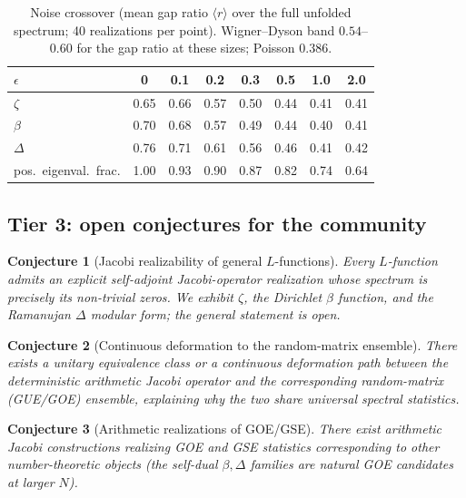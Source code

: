 \documentclass[aps,prx,reprint,floatfix]{revtex4-2}
\newtheorem{conjecture}{Conjecture}
\begin{document}
\begin{table}[htbp]
\centering
\footnotesize
\caption{Noise crossover (mean gap ratio $\langle r\rangle$ over the full
unfolded spectrum; 40 realizations per point). Wigner--Dyson band
$0.54$--$0.60$ for the gap ratio at these sizes; Poisson $0.386$.}
\label{tab:epsc}
\begin{tabular}{lccccccc}
\toprule
$\epsilon$ & 0 & 0.1 & 0.2 & 0.3 & 0.5 & 1.0 & 2.0\\
\midrule
$\zeta$   & 0.65 & 0.66 & 0.57 & 0.50 & 0.44 & 0.41 & 0.41\\
$\beta$   & 0.70 & 0.68 & 0.57 & 0.49 & 0.44 & 0.40 & 0.41\\
$\Delta$  & 0.76 & 0.71 & 0.61 & 0.56 & 0.46 & 0.41 & 0.42\\
pos.\ eigenval.\ frac. & 1.00 & 0.93 & 0.90 & 0.87 & 0.82 & 0.74 & 0.64\\
\bottomrule
\end{tabular}
\end{table}

\subsection{Tier 3: open conjectures for the community}

\begin{conjecture}[Jacobi realizability of general $L$-functions]
Every $L$-function admits an explicit self-adjoint Jacobi-operator
realization whose spectrum is precisely its non-trivial zeros. We exhibit
$\zeta$, the Dirichlet $\beta$ function, and the Ramanujan $\Delta$ modular
form; the general statement is open.
\end{conjecture}

\begin{conjecture}[Continuous deformation to the random-matrix ensemble]
There exists a unitary equivalence class or a continuous deformation path
between the deterministic arithmetic Jacobi operator and the corresponding
random-matrix (GUE/GOE) ensemble, explaining why the two share universal
spectral statistics.
\end{conjecture}

\begin{conjecture}[Arithmetic realizations of GOE/GSE]
There exist arithmetic Jacobi constructions realizing GOE and GSE statistics
corresponding to other number-theoretic objects (the self-dual
$\beta,\Delta$ families are natural GOE candidates at larger $N$).
\end{conjecture}
\end{document}
